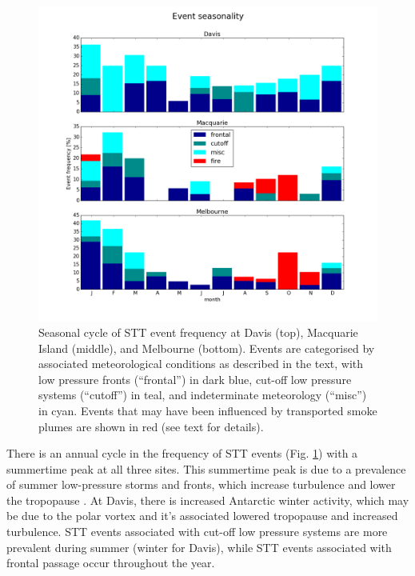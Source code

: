 \documentclass[acp, manuscript]{copernicus} %
\providecommand{\DIFaddbegin}{} %
\begin{document}
  \begin{figure}[t]
    \includegraphics[width=12cm]{figures/summary_season.png}
    \caption{Seasonal cycle of STT event frequency at Davis (top), Macquarie Island (middle), and Melbourne (bottom).
      Events are categorised by associated meteorological conditions as described in the text, with low pressure fronts (“frontal”) in dark blue, cut-off low pressure systems (“cutoff”) in teal, and indeterminate meteorology (“misc”) in cyan. 
      Events that may have been influenced by transported smoke plumes are shown in red (see text for details).}
    \label{fig:SummarySeasonality}
  \end{figure}

  There is an annual cycle in the frequency of STT events  (Fig. \ref{fig:SummarySeasonality}) with a summertime peak at all three sites.
  This summertime peak is due to a prevalence of summer low-pressure storms and fronts, which increase turbulence and lower the tropopause \citep{Reutter2015}.
  At Davis, there is increased Antarctic winter activity, which may be due to the polar vortex and it's associated lowered tropopause and increased turbulence.
  STT events associated with cut-off low pressure systems are more prevalent during summer (winter for Davis), while STT events associated with frontal passage occur throughout the year.
  \DIFaddbegin 
\end{document}
